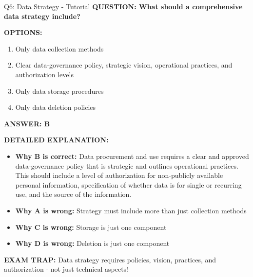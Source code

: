 \documentclass[8pt]{beamer}
\begin{document}
	\begin{frame}{Q6: Data Strategy - Tutorial}
		\fontsize{6.5}{7.5}\selectfont
		\textbf{QUESTION: What should a comprehensive data strategy include?}
		
		\vspace{0.1cm}
		\textbf{OPTIONS:}
		\begin{enumerate}
			\item Only data collection methods
			\item Clear data-governance policy, strategic vision, operational practices, and authorization levels
			\item Only data storage procedures
			\item Only data deletion policies
		\end{enumerate}
		
		\vspace{0.1cm}
		\textcolor{myblue}{\textbf{ANSWER: B}}
		
		\vspace{0.1cm}
		\textbf{DETAILED EXPLANATION:}
		\begin{itemize}
			\item \textbf{Why B is correct:} Data procurement and use requires a clear and approved data-governance policy that is strategic and outlines operational practices. This should include a level of authorization for non-publicly available personal information, specification of whether data is for single or recurring use, and the source of the information.
			\item \textbf{Why A is wrong:} Strategy must include more than just collection methods
			\item \textbf{Why C is wrong:} Storage is just one component
			\item \textbf{Why D is wrong:} Deletion is just one component
		\end{itemize}
		
		\textcolor{myred}{\textbf{EXAM TRAP:}} Data strategy requires \textcolor{myblue}{policies, vision, practices, and authorization} - not just technical aspects!
	\end{frame}
	
\end{document}
